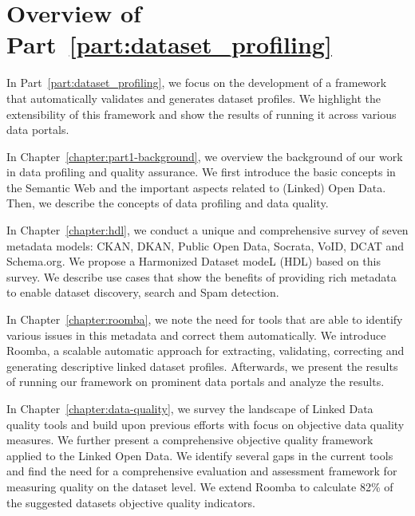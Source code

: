 \chapter*{Overview of Part~\ref{part:dataset_profiling}}

In Part~\ref{part:dataset_profiling}, we focus on the development of a framework that automatically validates and generates dataset profiles. We highlight the extensibility of this framework and show the results of running it across various data portals.

In Chapter~\ref{chapter:part1-background}, we overview the background of our work in data profiling and quality assurance. We first introduce the basic concepts in the Semantic Web and the important aspects related to (Linked) Open Data. Then, we describe the concepts of data profiling and data quality.

In Chapter~\ref{chapter:hdl}, we conduct a unique and comprehensive survey of seven metadata models: CKAN, DKAN, Public Open Data, Socrata, VoID, DCAT and Schema.org. We propose a Harmonized Dataset modeL (HDL) based on this survey. We describe use cases that show the benefits of providing rich metadata to enable dataset discovery, search and Spam detection.

In Chapter~\ref{chapter:roomba}, we note the need for tools that are able to identify various issues in this metadata and correct them automatically. We introduce Roomba, a scalable automatic approach for extracting, validating, correcting and generating descriptive linked dataset profiles. Afterwards, we present the results of running our framework on prominent data portals and analyze the results.

In Chapter~\ref{chapter:data-quality}, we survey the landscape of Linked Data quality tools and build upon previous efforts with focus on objective data quality measures. We further present a comprehensive objective quality framework applied to the Linked Open Data. We identify several gaps in the current tools and find the need for a comprehensive evaluation and assessment framework for measuring quality on the dataset level. We extend Roomba to calculate 82\% of the suggested datasets objective quality indicators.